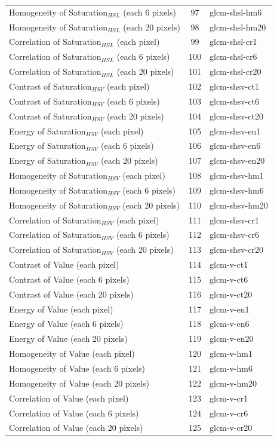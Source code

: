 \documentclass[11pt,a4paper,draft]{report}
\begin{document}
\begin{center}
\begin{longtable}{|l|c|l|}
Homogeneity of Saturation$_{HSL}$ (each 6 pixels) & 97 & glcm-shsl-hm6 \\
Homogeneity of Saturation$_{HSL}$ (each 20 pixels) & 98 & glcm-shsl-hm20 \\
Correlation of Saturation$_{HSL}$ (each pixel) & 99 & glcm-shsl-cr1 \\
Correlation of Saturation$_{HSL}$ (each 6 pixels) & 100 & glcm-shsl-cr6 \\
Correlation of Saturation$_{HSL}$ (each 20 pixels) & 101 & glcm-shsl-cr20 \\
Contrast of Saturation$_{HSV}$ (each pixel) & 102 & glcm-shsv-ct1 \\
Contrast of Saturation$_{HSV}$ (each 6 pixels) & 103 & glcm-shsv-ct6 \\
Contrast of Saturation$_{HSV}$ (each 20 pixels) & 104 & glcm-shsv-ct20 \\
Energy of Saturation$_{HSV}$ (each pixel) & 105 & glcm-shsv-en1 \\
Energy of Saturation$_{HSV}$ (each 6 pixels) & 106 & glcm-shsv-en6 \\
Energy of Saturation$_{HSV}$ (each 20 pixels) & 107 & glcm-shsv-en20 \\
Homogeneity of Saturation$_{HSV}$ (each pixel) & 108 & glcm-shsv-hm1 \\
Homogeneity of Saturation$_{HSV}$ (each 6 pixels) & 109 & glcm-shsv-hm6 \\
Homogeneity of Saturation$_{HSV}$ (each 20 pixels) & 110 & glcm-shsv-hm20 \\
Correlation of Saturation$_{HSV}$ (each pixel) & 111 & glcm-shsv-cr1 \\
Correlation of Saturation$_{HSV}$ (each 6 pixels) & 112 & glcm-shsv-cr6 \\
Correlation of Saturation$_{HSV}$ (each 20 pixels) & 113 & glcm-shsv-cr20 \\
Contrast of Value (each pixel) & 114 & glcm-v-ct1 \\
Contrast of Value (each 6 pixels) & 115 & glcm-v-ct6 \\
Contrast of Value (each 20 pixels) & 116 & glcm-v-ct20 \\
Energy of Value (each pixel) & 117 & glcm-v-en1 \\
Energy of Value (each 6 pixels) & 118 & glcm-v-en6 \\
Energy of Value (each 20 pixels) & 119 & glcm-v-en20 \\
Homogeneity of Value (each pixel) & 120 & glcm-v-hm1 \\
Homogeneity of Value (each 6 pixels) & 121 & glcm-v-hm6 \\
Homogeneity of Value (each 20 pixels) & 122 & glcm-v-hm20 \\
Correlation of Value (each pixel) & 123 & glcm-v-cr1 \\
Correlation of Value (each 6 pixels) & 124 & glcm-v-cr6 \\
Correlation of Value (each 20 pixels) & 125 & glcm-v-cr20 \\


\end{longtable}
\end{center}
\end{document}
